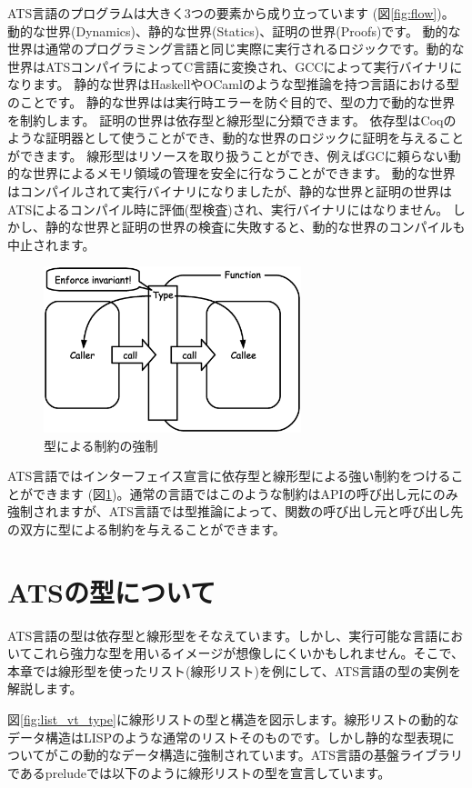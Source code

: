 \documentclass{ipsjprosym}
\begin{document}
ATS言語のプログラムは大きく3つの要素から成り立っています (図\ref{fig:flow})。 動的な世界(Dynamics)、静的な世界(Statics)、証明の世界(Proofs)です。 動的な世界は通常のプログラミング言語と同じ実際に実行されるロジックです。動的な世界はATSコンパイラによってC言語に変換され、GCCによって実行バイナリになります。 静的な世界はHaskellやOCamlのような型推論を持つ言語における型のことです。 静的な世界はは実行時エラーを防ぐ目的で、型の力で動的な世界を制約します。 証明の世界は依存型と線形型に分類できます。 依存型はCoqのような証明器として使うことができ、動的な世界のロジックに証明を与えることができます。 線形型はリソースを取り扱うことができ、例えばGCに頼らない動的な世界によるメモリ領域の管理を安全に行なうことができます。 動的な世界はコンパイルされて実行バイナリになりましたが、静的な世界と証明の世界はATSによるコンパイル時に評価(型検査)され、実行バイナリにはなりません。 しかし、静的な世界と証明の世界の検査に失敗すると、動的な世界のコンパイルも中止されます。

\begin{figure}[h]
\centering
\includegraphics[width=75mm]{draw/enforce_invariant.eps}
\caption{型による制約の強制}
\label{fig:enforce_invariant}
\end{figure}

ATS言語ではインターフェイス宣言に依存型と線形型による強い制約をつけることができます (図\ref{fig:enforce_invariant})。通常の言語ではこのような制約はAPIの呼び出し元にのみ強制されますが、ATS言語では型推論によって、関数の呼び出し元と呼び出し先の双方に型による制約を与えることができます。

\section{ATSの型について}

ATS言語の型は依存型と線形型をそなえています。しかし、実行可能な言語においてこれら強力な型を用いるイメージが想像しにくいかもしれません。そこで、本章では線形型を使ったリスト(線形リスト)を例にして、ATS言語の型の実例を解説します。

図\ref{fig:list_vt_type}に線形リストの型と構造を図示します。線形リストの動的なデータ構造はLISPのような通常のリストそのものです。しかし静的な型表現についてがこの動的なデータ構造に強制されています。ATS言語の基盤ライブラリであるpreludeでは以下のように線形リストの型を宣言しています。
\end{document}
